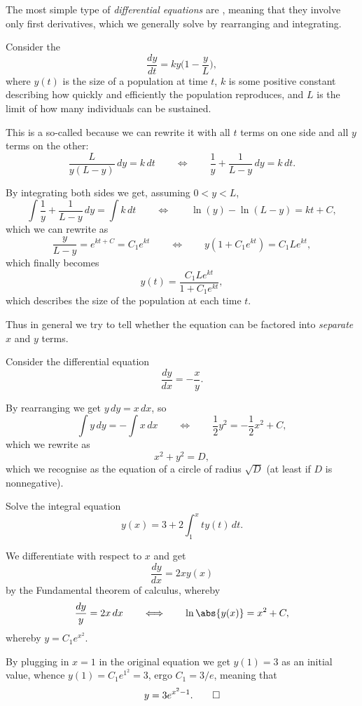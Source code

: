

The most simple type of \emph{differential equations} are , meaning that they involve only first derivatives, which we generally solve by rearranging and integrating.

\begin{example}
	Consider the 
	\[
		\frac{d y}{d t} = k y \Big ( 1 - \frac{y}{L} \Big ),
	\]
	where $y(t)$ is the size of a population at time $t$, $k$ is some positive constant describing how quickly and efficiently the population reproduces, and $L$ is the limit of how many individuals can be sustained.

	This is a so-called  because we can rewrite it with all $t$ terms on one side and all $y$ terms on the other:
	\[
		\frac{L}{y(L - y)} \, d y = k \, d t \qquad \Longleftrightarrow \qquad \frac{1}{y} + \frac{1}{L - y} \, d y = k \, d t.
	\]

	\noindent
	By integrating both sides we get, assuming $0 < y < L$,
	\[
		\int \frac{1}{y} + \frac{1}{L - y} \, d y = \int k \, d t \qquad \Longleftrightarrow \qquad \ln(y) - \ln(L - y) = k t + C,
	\]
	which we can rewrite as
	\[
		\frac{y}{L - y} = e^{k t + C} = C_1 e^{k t} \qquad \Longleftrightarrow \qquad y (1 + C_1 e^{k t}) = C_1 L e^{k t},
	\]
	which finally becomes
	\[
		y(t) = \frac{C_1 L e^{k t}}{1 + C_1 e^{k t}},
	\]
	which describes the size of the population at each time $t$.
\end{example}

\noindent
Thus in general we try to tell whether the equation can be factored into \emph{separate} $x$ and $y$ terms.

\begin{example}
	Consider the differential equation
	\[
		\frac{d y}{d x} = - \frac{x}{y}.
	\]

	\noindent
	By rearranging we get $y \, dy = x \, d x$, so
	\[
		\int y \, d y = - \int x \, d x \qquad \Longleftrightarrow \qquad \frac{1}{2} y^2 = - \frac{1}{2} x^2 + C,
	\]
	which we rewrite as
	\[
		x^2 + y^2 = D,
	\]
	which we recognise as the equation of a circle of radius $\sqrt{D}$ (at least if $D$ is nonnegative).
\end{example}

\begin{example}
	Solve the integral equation
	\[
		y(x) = 3 + 2 \int_1^x t y(t) \, d t.
	\]

	\noindent
	We differentiate with respect to $x$ and get
	\[
		\frac{d y}{d x} = 2 x y(x)
	\]
	by the Fundamental theorem of calculus, whereby
	\[
		\frac{d y}{y} = 2 x \, d x \qquad \Longleftrightarrow \qquad \ln\abs{y(x)} = x^2 + C,
	\]
	whereby $y = C_1 e^{x^2}$.

	By plugging in $x = 1$ in the original equation we get $y(1) = 3$ as an initial value, whence $y(1) = C_1 e^{1^2} = 3$, ergo $C_1 = 3 / e$, meaning that
	\[
		y = 3 e^{x^2 - 1}. \qedhere
	\]
\end{example}

